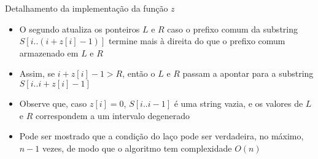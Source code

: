\begin{frame}[fragile]{Detalhamento da implementação da função $z$}

    \begin{itemize}
        \item O segundo  atualiza os ponteiros $L$ e $R$ caso o prefixo
            comum da substring $S[i..(i+z[i]-1)]$ termine mais à direita do que o prefixo
            comum armazenado em $L$ e $R$
        \pause

        \item Assim, se $i+z[i]-1 > R$, então o $L$ e $R$ passam a apontar para a substring 
            $S[i..i+z[i]-1]$

        \vspace{0.1in}
        \vspace{0.1in}
        \pause

        \item Observe que, caso $z[i] = 0$, $S[i..i-1]$ é uma string vazia, e os valores de
            $L$ e $R$ correspondem a um intervalo degenerado
        \pause

        \item Pode ser mostrado que a condição do laço  pode ser verdadeira, no
            máximo, $n - 1$ vezes, de modo que o algoritmo tem complexidade $O(n)$

    \end{itemize}

\end{frame}

